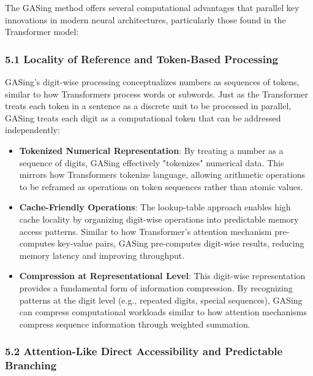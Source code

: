 The GASing method offers several computational advantages that parallel key innovations in modern neural architectures, particularly those found in the Transformer model:
\subsubsection{5.1 Locality of Reference and Token-Based Processing}

GASing's digit-wise processing conceptualizes numbers as sequences of tokens, similar to how Transformers process words or subwords. Just as the Transformer treats each token in a sentence as a discrete unit to be processed in parallel, GASing treats each digit as a computational token that can be addressed independently:

\begin{itemize}
\item \textbf{Tokenized Numerical Representation}: By treating a number as a sequence of digits, GASing effectively "tokenizes" numerical data. This mirrors how Transformers tokenize language, allowing arithmetic operations to be reframed as operations on token sequences rather than atomic values.
\end{itemize}

\begin{itemize}
\item \textbf{Cache-Friendly Operations}: The lookup-table approach enables high cache locality by organizing digit-wise operations into predictable memory access patterns. Similar to how Transformer's attention mechanism pre-computes key-value pairs, GASing pre-computes digit-wise results, reducing memory latency and improving throughput.
\end{itemize}

\begin{itemize}
\item \textbf{Compression at Representational Level}: This digit-wise representation provides a fundamental form of information compression. By recognizing patterns at the digit level (e.g., repeated digits, special sequences), GASing can compress computational workloads similar to how attention mechanisms compress sequence information through weighted summation.
\end{itemize}
\subsubsection{5.2 Attention-Like Direct Accessibility and Predictable Branching}

